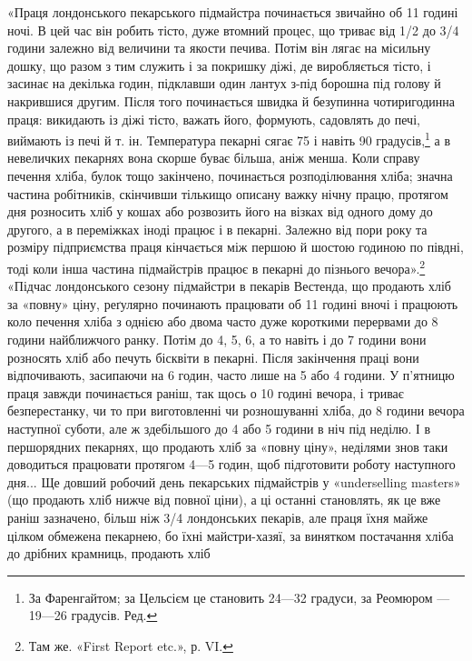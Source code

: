 «Праця лондонського пекарського підмайстра починається
звичайно об 11 годині ночі. В цей час він робить тісто, дуже втомний
процес, що триває від 1/2 до 3/4 години залежно від величини
та якости печива. Потім він лягає на місильну дошку, що разом
з тим служить і за покришку діжі, де виробляється тісто, і засинає
на декілька годин, підклавши один лантух з-під борошна під
голову й накрившися другим. Після того починається швидка й
безупинна чотиригодинна праця: викидають із діжі тісто, важать
його, формують, садовлять до печі, виймають із печі й т. ін. Температура
пекарні сягає 75 і навіть 90 градусів,\footnote*{
За Фаренгайтом; за Цельсієм це становить 24—32 градуси, за
Реомюром — 19—26 градусів. Ред.
} а в невеличких пекарнях
вона скорше буває більша, аніж менша. Коли справу печення
хліба, булок тощо закінчено, починається розподілювання хліба;
значна частина робітників, скінчивши тількищо описану важку
нічну працю, протягом дня розносить хліб у кошах або розвозить
його на візках від одного дому до другого, а в переміжках іноді працює
і в пекарні. Залежно від пори року та розміру підприємства
праця кінчається між першою й шостою годиною по півдні, тоді коли
інша частина підмайстрів працює в пекарні до пізнього вечора».\footnote{
Там же. «First Report etc.», р. VI.
}
«Підчас лондонського сезону підмайстри в пекарів Вестенда, що
продають хліб за «повну» ціну, реґулярно починають працювати
об 11 годині вночі і працюють коло печення хліба з однією або
двома часто дуже короткими перервами до 8 години найближчого
ранку. Потім до 4, 5, 6, а то навіть і до 7 години вони розносять
хліб або печуть бісквіти в пекарні. Після закінчення праці вони
відпочивають, засипаючи на 6 годин, часто лише на 5 або 4 години.
У п’ятницю праця завжди починається раніш, так щось о 10 годині
вечора, і триває безперестанку, чи то при виготовленні чи розношуванні
хліба, до 8 години вечора наступної суботи, але ж здебільшого
до 4 або 5 години в ніч під неділю. І в першорядних
пекарнях, що продають хліб за «повну ціну», неділями знов таки
доводиться працювати протягом 4—5 годин, щоб підготовити
роботу наступного дня... Ще довший робочий день пекарських
підмайстрів у «underselling masters» (що продають хліб нижче
від повної ціни), а ці останні становлять, як це вже раніш зазначено,
більш ніж 3/4 лондонських пекарів, але праця їхня
майже цілком обмежена пекарнею, бо їхні майстри-хазяї, за
винятком постачання хліба до дрібних крамниць, продають хліб
\parbreak{}  %
